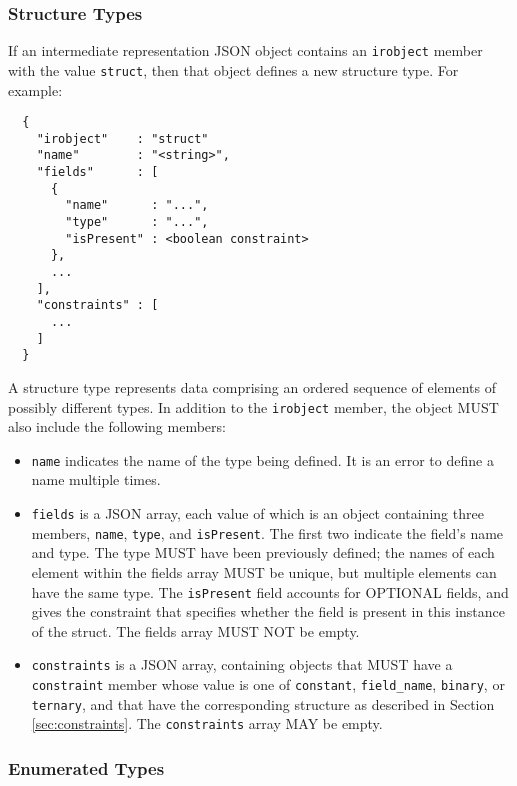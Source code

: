 \documentclass[twocolumn,a4paper]{article}
\begin{document}
\subsubsection{Structure Types}

If an intermediate representation JSON object contains an \texttt{irobject}
member with the value \texttt{struct}, then that object defines a new
structure type. For example:

\begin{verbatim}
  {
    "irobject"    : "struct"
    "name"        : "<string>",
    "fields"      : [
      {
        "name"      : "...",
        "type"      : "...",
        "isPresent" : <boolean constraint>
      },
      ...
    ],
    "constraints" : [
      ...
    ]
  }
\end{verbatim}

A structure type represents data comprising an ordered sequence of elements
of possibly different types. In addition to the \texttt{irobject} member, 
the object MUST also include the following members:
\begin{itemize}
  \item \texttt{name} indicates the name of the type being defined. It is
    an error to define a name multiple times.
  \item \texttt{fields} is a JSON array, each value of which is an object
    containing three members, \texttt{name}, \texttt{type}, and \texttt{isPresent}.
    The first two indicate the field's name and type. The type MUST have
    been previously defined; the names of each element within the fields
    array MUST be unique, but multiple elements can have the same type.
    The \texttt{isPresent} field accounts for OPTIONAL fields, and gives
    the constraint that specifies whether the field is present in this
    instance of the struct.
    The fields array MUST NOT be empty.
  \item \texttt{constraints} is a JSON array, containing objects that MUST have a
    \texttt{constraint} member whose value is one of \texttt{constant},
    \texttt{field\_name}, \texttt{binary}, or \texttt{ternary}, and that have the
    corresponding structure as described in Section \ref{sec:constraints}. The
    \texttt{constraints} array MAY be empty.
\end{itemize}

\subsubsection{Enumerated Types}
\end{document}
